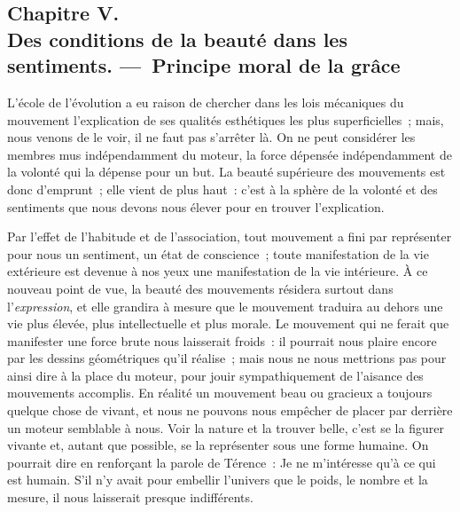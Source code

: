 \documentclass[french,twoside]{book} %
\begin{document}
\subsection[{Chapitre V. Des conditions de la beauté dans les sentiments. — Principe moral de la grâce}]{Chapitre V. \\
Des conditions de la beauté dans les sentiments. — Principe moral de la grâce}
\noindent  L’école de l’évolution a eu raison de chercher dans les lois mécaniques du mouvement l’explication de ses qualités esthétiques les plus superficielles ; mais, nous venons de le voir, il ne faut pas s’arrêter là. On ne peut considérer les membres mus indépendamment du moteur, la force dépensée indépendamment de la volonté qui la dépense pour un but. La beauté supérieure des mouvements est donc d’emprunt ; elle vient de plus haut : c’est à la sphère de la volonté et des sentiments que nous devons nous élever pour en trouver l’explication.\par
Par l’effet de l’habitude et de l’association, tout mouvement a fini par représenter pour nous un sentiment, un état de conscience ; toute manifestation de la vie extérieure est devenue à nos yeux une manifestation de la vie intérieure. À ce nouveau point de vue, la beauté des mouvements résidera surtout dans l’\emph{expression}, et elle grandira à mesure que le mouvement traduira au dehors une vie plus élevée, plus intellectuelle et plus morale. Le mouvement  qui ne ferait que manifester une force brute nous laisserait froids : il pourrait nous plaire encore par les dessins géométriques qu’il réalise ; mais nous ne nous mettrions pas pour ainsi dire à la place du moteur, pour jouir sympathiquement de l’aisance des mouvements accomplis. En réalité un mouvement beau ou gracieux a toujours quelque chose de vivant, et nous ne pouvons nous empêcher de placer par derrière un moteur semblable à nous. Voir la nature et la trouver belle, c’est se la figurer vivante et, autant que possible, se la représenter sous une forme humaine. On pourrait dire en renforçant la parole de Térence : Je ne m’intéresse qu’à ce qui est humain. S’il n’y avait pour embellir l’univers que le poids, le nombre et la mesure, il nous laisserait presque indifférents.\par
\end{document}
